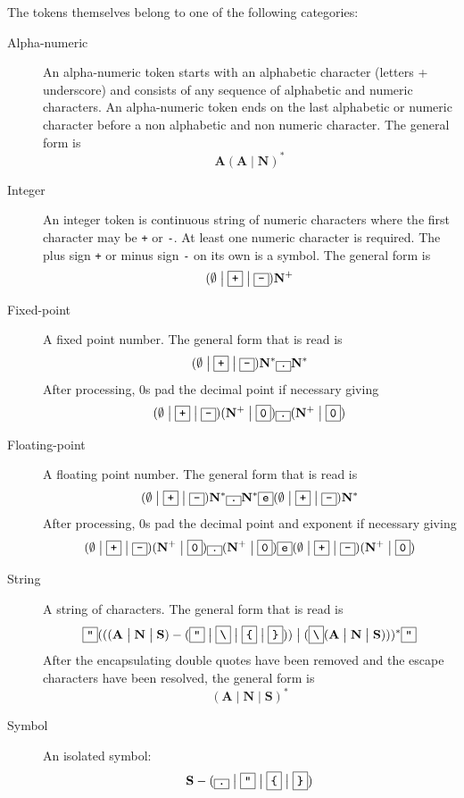 \documentclass{article}
\newcommand{\literal}[1]{\fbox{\texttt{#1}}}
\newcommand{\sor}{\;\big|\;}
\begin{document}
The tokens themselves belong to one of the following categories:
\begin{description}
\item[Alpha-numeric] An alpha-numeric token starts with an alphabetic character (letters + underscore) and consists of any sequence of alphabetic and numeric characters. An alpha-numeric token ends on the last alphabetic or numeric character before a non alphabetic and non numeric character. The general form is 
\[\mathbf{A}(\mathbf{A}\sor\mathbf{N})^*\]
\item[Integer] An integer token is continuous string of numeric characters where the first character may be \texttt{+} or \texttt{-}. At least one numeric character is required. The plus sign \texttt{+} or minus sign \texttt{-} on its own is a symbol. The general form is 
\[(\emptyset\sor\literal{+}\sor\literal{-})\mathbf{N}^+\]
\item[Fixed-point] A fixed point number. The general form that is read is 
\[(\emptyset\sor\literal{+}\sor\literal{-})\mathbf{N}^*\literal{.}\mathbf{N}^*\] 
After processing, 0s pad the decimal point if necessary giving 
\[(\emptyset\sor\literal{+}\sor\literal{-})(\mathbf{N}^+\sor\literal{0})\literal{.}(\mathbf{N}^+\sor\literal{0})\]
\item[Floating-point] A floating point number. The general form that is read is 
\[(\emptyset\sor\literal{+}\sor\literal{-})\mathbf{N}^*\literal{.}\mathbf{N}^*\literal{e}(\emptyset\sor\literal{+}\sor\literal{-})\mathbf{N}^*\] 
After processing, 0s pad the decimal point and exponent if necessary giving 
\[(\emptyset\sor\literal{+}\sor\literal{-})(\mathbf{N}^+\sor\literal{0})\literal{.}(\mathbf{N}^+\sor\literal{0})\literal{e}(\emptyset\sor\literal{+}\sor\literal{-})(\mathbf{N}^+\sor\literal{0})\]
\item[String] A string of characters. The general form that is read is 
\[\literal{"}(((\mathbf{A}\sor\mathbf{N}\sor\mathbf{S})-(\literal{"}\sor\literal{\textbackslash}\sor\literal{\{}\sor\literal{\}}))\sor(\literal{\textbackslash}(\mathbf{A}\sor\mathbf{N}\sor\mathbf{S})))^*\literal{"}\]
After the encapsulating double quotes have been removed and the escape characters have been resolved, the general form is 
\[(\mathbf{A}\sor\mathbf{N}\sor\mathbf{S})^*\]
\item[Symbol] An isolated symbol: 
\[\mathbf{S} - (\literal{.}\sor\literal{"}\sor\literal{\{}\sor\literal{\}})\]
\end{description}
\end{document}
